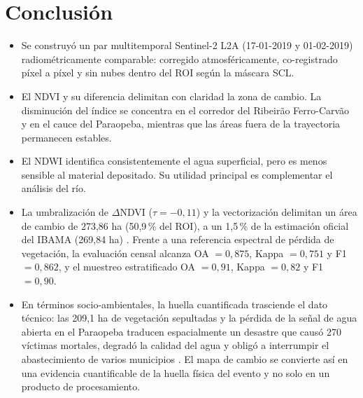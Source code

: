 \documentclass[12pt]{article}
\begin{document}
\section{Conclusión}
\begin{itemize}
    \item Se construyó un par multitemporal Sentinel-2 L2A (17-01-2019 y 01-02-2019) radiométricamente comparable: corregido atmosféricamente, co-registrado píxel a píxel y sin nubes dentro del ROI según la máscara SCL.
    \item El NDVI y su diferencia delimitan con claridad la zona de cambio. La disminución del índice se concentra en el corredor del Ribeirão Ferro-Carvão y en el cauce del Paraopeba, mientras que las áreas fuera de la trayectoria permanecen estables.
    \item El NDWI identifica consistentemente el agua superficial, pero es menos sensible al material depositado. Su utilidad principal es complementar el análisis del río.
    \item La umbralización de $\Delta$NDVI ($\tau=-0{,}11$) y la vectorización delimitan un área de cambio de 273{,}86 ha (50{,}9\,\% del ROI), a un 1{,}5\,\% de la estimación oficial del IBAMA (269{,}84 ha) \parencite{IBAMA2019}. Frente a una referencia espectral de pérdida de vegetación, la evaluación censal alcanza OA $=0{,}875$, Kappa $=0{,}751$ y F1 $=0{,}862$, y el muestreo estratificado OA $=0{,}91$, Kappa $=0{,}82$ y F1 $=0{,}90$.
    \item En términos socio-ambientales, la huella cuantificada trasciende el dato técnico: las 209{,}1 ha de vegetación sepultadas y la pérdida de la señal de agua abierta en el Paraopeba traducen espacialmente un desastre que causó 270 víctimas mortales, degradó la calidad del agua y obligó a interrumpir el abastecimiento de varios municipios \parencite{Rotta2020}. El mapa de cambio se convierte así en una evidencia cuantificable de la huella física del evento y no solo en un producto de procesamiento.
\end{itemize}

\printbibliography
\end{document}
